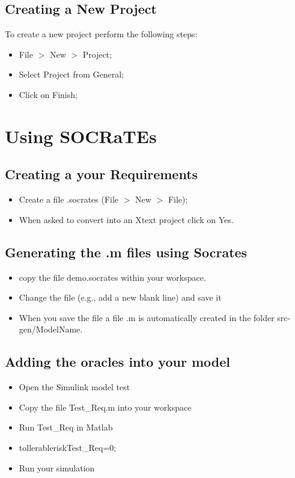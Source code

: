 \documentclass[12pt]{extarticle}
\newcommand{\<}{\langle}
\renewcommand{\>}{\rangle}
\theoremstyle{definition}
\begin{document}
\subsection{Creating a New Project}
To create a new project perform the following steps:
\begin{itemize}
\item File $>$ New $>$ Project;
\item Select Project from General;
\item Click on Finish;
\end{itemize}


\section{Using SOCRaTEs}

\subsection{Creating a your Requirements}
\begin{itemize}
\item Create a file .socrates (File $>$ New $>$ File);
\item When asked to convert into an Xtext project click on Yes.
\end{itemize}

\subsection{Generating the .m files using Socrates}
\begin{itemize}
\item copy the file demo.socrates within your workspace.
\item Change the file (e.g., add a new blank line) and save it
\item	When you save the file a file .m is automatically created in the folder src-gen/ModelName.
\end{itemize}

\subsection{Adding the oracles into your model}
\begin{itemize}
\item	Open the Simulink model test
\item	Copy the file Test\_Req.m into your workspace
\item	Run Test\_Req in Matlab
\item	tollerableriskTest\_Req=0;
\item	Run your simulation
\end{itemize}
\end{document}
